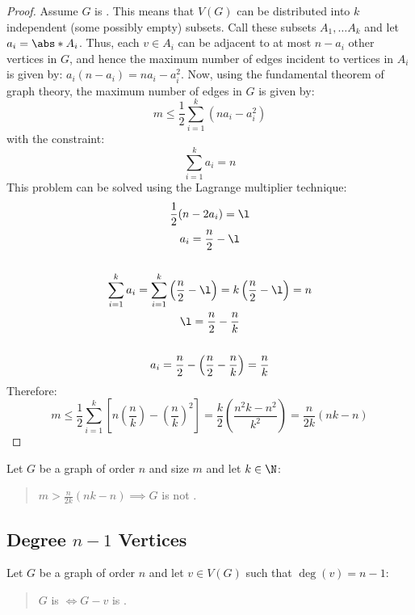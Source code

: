 \begin{proof}
  Assume \(G\) is .  This means that \(V(G)\) can be distributed into \(k\) independent (some possibly empty)
  subsets.  Call these subsets \(A_1,\ldots A_k\) and let \(a_i=\abs*{A_i}\).  Thus, each \(v\in A_i\) can be adjacent to at
  most \(n-a_i\) other vertices in \(G\), and hence the maximum number of edges incident to vertices in \(A_i\) is given by:
  \(a_i(n-a_i)=na_i-a_i^2\).  Now, using the fundamental theorem of graph theory, the maximum number of edges in \(G\) is given
  by:
  \[m\le\frac{1}{2}\sum_{i=1}^k(na_i-a_i^2)\]
  with the constraint:
  \[\sum_{i=1}^ka_i=n\]
  This problem can be solved using the Lagrange multiplier technique:
  \begin{gather*}
    \frac{1}{2}(n-2a_i)=\l \\
    a_i=\frac{n}{2}-\l \\
    \\
    \sum_{i=1}^ka_i=\sum_{i=1}^k\left(\frac{n}{2}-\l\right)=k\left(\frac{n}{2}-\l\right)=n \\
    \l=\frac{n}{2}-\frac{n}{k} \\
    \\
    a_i=\frac{n}{2}-\left(\frac{n}{2}-\frac{n}{k}\right)=\frac{n}{k}
  \end{gather*}
  Therefore:
  \[m\le\frac{1}{2}\sum_{i=1}^k\left[n\left(\frac{n}{k}\right)-\left(\frac{n}{k}\right)^2\right]=
  \frac{k}{2}\left(\frac{n^2k-n^2}{k^2}\right)=\frac{n}{2k}(nk-n)\]
\end{proof}

\begin{corollary}
  \label{cor:density}
  Let \(G\) be a graph of order \(n\) and size \(m\) and let \(k\in\N\):
  \begin{quote}
    \(\displaystyle m>\frac{n}{2k}(nk-n)\implies G\) is not .
  \end{quote}
\end{corollary}

\subsection{Degree \(n-1\) Vertices}

\begin{lemma}
  \label{lem:adjall}
  Let \(G\) be a graph of order \(n\) and let \(v\in V(G)\) such that \(\deg(v)=n-1\):
  \begin{quote}
    \(G\) is  \(\iff G-v\) is .
  \end{quote}
\end{lemma}

